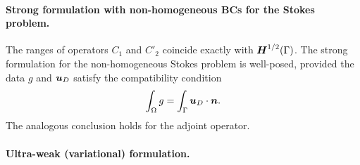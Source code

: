 
\paragraph*{Strong formulation with non-homogeneous BCs for the Stokes problem.}
The ranges of operators $C_1$ and $C'_2$ coincide exactly with
$\bfH^{1/2}(\Gamma)$.  The strong formulation for the non-homogeneous
Stokes problem is well-posed, provided the data $g$ and $\bfu_D$ satisfy the
compatibility condition
\[ 
\int_\Omega g = \int_{\Gamma} \bfu_D \cdot
\bfn.
\] 
The analogous conclusion holds for the adjoint operator.


\paragraph{Ultra-weak (variational) formulation.}


